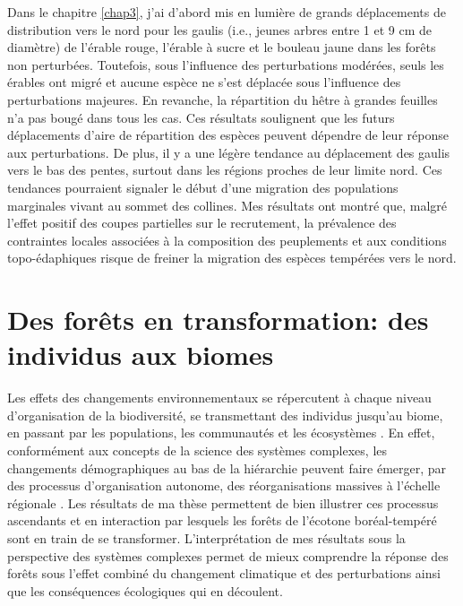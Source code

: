 Dans le chapitre \ref{chap3}, j'ai d'abord mis en lumière de grands
déplacements de distribution vers le nord pour les gaulis (i.e., jeunes
arbres entre 1 et 9 cm de diamètre) de l'érable rouge, l'érable à sucre
et le bouleau jaune dans les forêts non perturbées. Toutefois, sous
l'influence des perturbations modérées, seuls les érables ont migré et
aucune espèce ne s'est déplacée sous l'influence des perturbations
majeures. En revanche, la répartition du hêtre à grandes feuilles n'a
pas bougé dans tous les cas. Ces résultats soulignent que les futurs
déplacements d'aire de répartition des espèces peuvent dépendre de leur
réponse aux perturbations. De plus, il y a une légère tendance au
déplacement des gaulis vers le bas des pentes, surtout dans les régions
proches de leur limite nord. Ces tendances pourraient signaler le début
d'une migration des populations marginales vivant au sommet des
collines. Mes résultats ont montré que, malgré l'effet positif des
coupes partielles sur le recrutement, la prévalence des contraintes
locales associées à la composition des peuplements et aux conditions
topo-édaphiques risque de freiner la migration des espèces tempérées
vers le nord.

\hypertarget{des-foruxeats-en-transformation-des-individus-aux-biomes}{%
\section{Des forêts en transformation: des individus aux
biomes}\label{des-foruxeats-en-transformation-des-individus-aux-biomes}}

Les effets des changements environnementaux se répercutent à chaque
niveau d'organisation de la biodiversité, se transmettant des individus
jusqu'au biome, en passant par les populations, les communautés et les
écosystèmes \citep{bellard_impacts_2012, parmesan_globally_2003}. En
effet, conformément aux concepts de la science des systèmes complexes,
les changements démographiques au bas de la hiérarchie peuvent faire
émerger, par des processus d'organisation autonome, des réorganisations
massives à l'échelle régionale \citep[Fig.
\ref{fig4.2};][]{filotas_viewing_2014, messier_managing_2013}. Les
résultats de ma thèse permettent de bien illustrer ces processus
ascendants et en interaction par lesquels les forêts de l'écotone
boréal-tempéré sont en train de se transformer. L'interprétation de mes
résultats sous la perspective des systèmes complexes permet de mieux
comprendre la réponse des forêts sous l'effet combiné du changement
climatique et des perturbations ainsi que les conséquences écologiques
qui en découlent.

